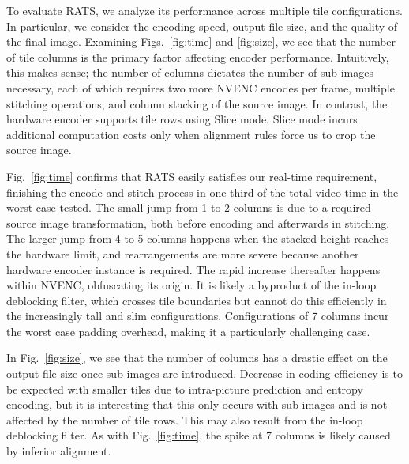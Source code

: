To evaluate RATS, we analyze its performance across multiple tile configurations. In particular, we consider the encoding speed, output file size, and the quality of the final image.
%
Examining Figs.~\ref{fig:time} and \ref{fig:size}, we see that the number of tile columns is the primary factor affecting encoder performance. Intuitively, this makes sense; the number of columns dictates the number of sub-images necessary, each of which requires two more NVENC encodes per frame, multiple stitching operations, and column stacking of the source image. In contrast, the hardware encoder supports tile rows using Slice mode. Slice mode incurs additional computation costs only when alignment rules force us to crop the source image.

Fig.~\ref{fig:time} confirms that RATS easily satisfies our real-time requirement, finishing the encode and stitch process in one-third of the total video time in the worst case tested.
The small jump from 1 to 2 columns is due to a required source image transformation, both before encoding and afterwards in stitching.
The larger jump from 4 to 5 columns happens when the stacked height reaches the hardware limit, and rearrangements are more severe because another hardware encoder instance is required.
The rapid increase thereafter happens within NVENC, obfuscating its origin.
It is likely a byproduct of the in-loop deblocking filter, which crosses tile boundaries but cannot do this efficiently in the increasingly tall and slim configurations. Configurations of 7 columns incur the worst case padding overhead, making it a particularly challenging case.


In Fig.~\ref{fig:size}, we see that the number of columns has a drastic effect on the output file size once sub-images are introduced. Decrease in coding efficiency is to be expected with smaller tiles due to intra-picture prediction and entropy encoding, but it is interesting that this only occurs with sub-images and is not affected by the number of tile rows.
This may also result from the in-loop deblocking filter.
As with Fig.~\ref{fig:time}, the spike at 7 columns is likely caused by inferior alignment.

